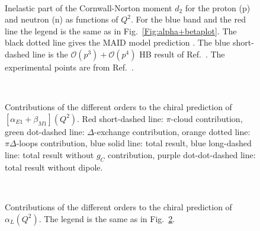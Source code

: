 \documentclass[twocolumn,prc,showpacs,nofootinbib,preprintnumbers,amsmath,amssymb,superscriptaddress]{revtex4-1}
\begin{document}
\begin{figure}[H]
\begin{center}
\hspace{-0.3cm} \\[0.5cm]
\hspace{-0.3cm} 
\caption{Inelastic part of the Cornwall-Norton moment $d_2$ for the proton (p) and neutron (n) as functions of $Q^2$. For the blue band and the red line the legend is the same as in Fig.~\ref{Fig:alpha+betaplot}. The black dotted line gives the MAID model prediction \cite{MAID}. The blue short-dashed line is the $\mathcal{O}(p^3)+\mathcal{O}(p^4)$ HB result of Ref.~\cite{Kao:2002cp,Kao:2003jd}. The experimental points are from Ref.~\cite{Amarian:2003jy}.
\label{Fig:d2plot}}
\end{center}
\end{figure}

\begin{figure}[H]
\begin{center}
\hspace{-0.3cm}\\[0.5cm]
\hspace{-0.3cm} 
\caption{\small{Contributions of the different orders to the chiral prediction of $[\alpha_{E1}+\beta_{M1}](Q^2)$. Red short-dashed line: $\pi$-cloud contribution, green dot-dashed line: $\Delta$-exchange contribution, orange dotted line: $\pi \Delta$-loops contribution, blue solid line: total result, blue long-dashed line: total result without $g_C$ contribution, purple dot-dot-dashed line: total result without dipole.}\label{Fig:alpha+beta-orders}}
\end{center}
\end{figure}

\begin{figure}[H]
\begin{center}
\hspace{-0.3cm}\\[0.5cm] \hspace{-0.3cm} 
\caption{Contributions of the different orders to the chiral prediction of $\alpha_{L}(Q^2)$. The legend is the same as in Fig.~\ref{Fig:alpha+beta-orders}. \label{Fig:alphaL-orders}}
\end{center}
\end{figure}
\end{document}
